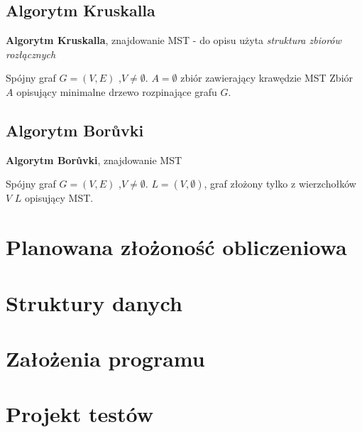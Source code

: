 \documentclass[a4paper, 10pt]{article}
\begin{document}
	\subsection{Algorytm Kruskalla}
	
	
	
\begin{algorithm}
\caption{{\bf Algorytm Kruskalla}, znajdowanie MST - do opisu użyta \textit{struktura zbiorów rozłącznych}}
\begin{algorithmic}[!h]
\REQUIRE Spójny graf $G=(V,E)$ ,$V \neq \emptyset$. 
\ENSURE $A=\emptyset$ zbiór zawierający krawędzie MST
\ENDFOR 
{}
\ENDIF
\ENDFOR 
\RETURN Zbiór $A$ opisujący minimalne drzewo rozpinające grafu $G$.
\end{algorithmic}
\end{algorithm}
\FloatBarrier


	\subsection{Algorytm Borůvki}
	
	
\begin{algorithm}
\caption{{\bf Algorytm Borůvki}, znajdowanie MST}
\begin{algorithmic}[!h]
\REQUIRE Spójny graf $G=(V,E)$ ,$V \neq \emptyset$. 
\ENSURE $L=(V,\emptyset)$, graf złożony tylko z wierzchołków $V$
\STATE {}
\STATE {}
\ENDFOR 
\ENDWHILE
\RETURN $L$ opisujący MST.
\end{algorithmic}
\end{algorithm}


\FloatBarrier

\section{Planowana złożoność obliczeniowa}
\section{Struktury danych}
\section{Założenia programu}
\section{Projekt testów}
	
	





\nocite{*}

\end{document}
